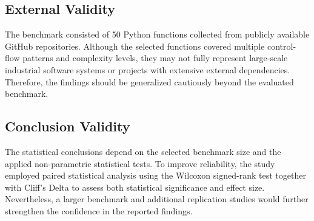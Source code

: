 \documentclass[conference]{IEEEtran}
\begin{document}
\subsection{External Validity}
   The benchmark consisted of 50 Python functions collected from publicly available GitHub repositories. Although the selected functions covered multiple control-flow patterns and complexity levels, they may not fully represent large-scale industrial software systems or projects with extensive external dependencies. Therefore, the findings should be generalized cautiously beyond the evaluated benchmark.
\subsection{Conclusion Validity}
   The statistical conclusions depend on the selected benchmark size and the applied non-parametric statistical tests. To improve reliability, the study employed paired statistical analysis using the Wilcoxon signed-rank test together with Cliff's Delta to assess both statistical significance and effect size. Nevertheless, a larger benchmark and additional replication studies would further strengthen the confidence in the reported findings.
\end{document}
